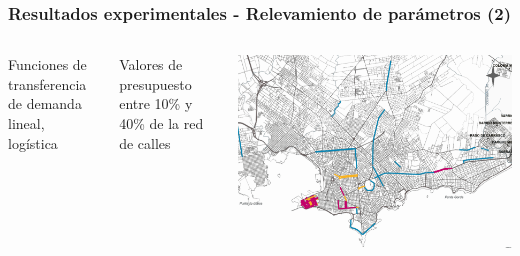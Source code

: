 \documentclass[aspectratio=43, 10pt]{beamer}
\begin{document}
\begin{frame}
    \frametitle{Resultados experimentales - Relevamiento de parámetros (2)}

    \begin{columns}[c]
        \begin{block}{Funciones de transferencia de demanda}
            lineal, logística \parencite{shwe2014, ortuz2011}
        \end{block}

        \begin{block}{Valores de presupuesto}
            entre 10\% y 40\% de la red de calles \parencite{rios2015, shwe2014}
        \end{block}

        \begin{center}
        \includegraphics[width=.9\textwidth]{../resources/bicicircuitos_montevideo.png}
        \end{center}


\end{columns}
\end{frame}
\end{document}
